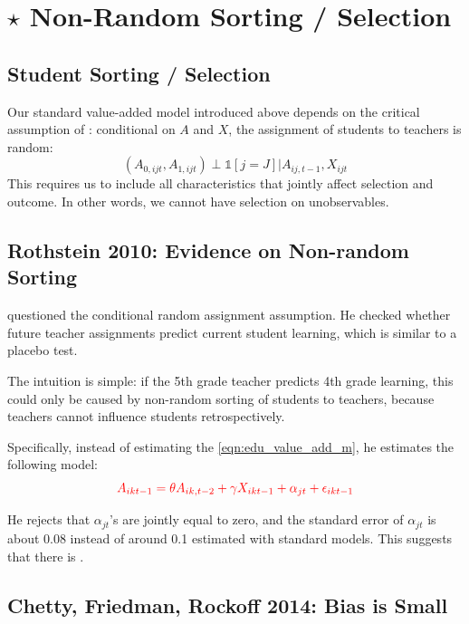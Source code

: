 \section{$\star$ Non-Random Sorting / Selection}
    
    \subsection{Student Sorting / Selection}
        Our standard value-added model introduced above depends on the critical assumption of : conditional on $A$ and $X$, the assignment of students to teachers is random:
        $$(A_{0,ijt},A_{1,ijt})\perp \mathds{1}[j=J]|A_{ij,t-1},X_{ijt}$$
        This requires us to include all characteristics that jointly affect selection and outcome. In other words, we cannot have selection on unobservables.
        
    \subsection{Rothstein 2010: Evidence on Non-random Sorting}
        \cite{rothstein_teacher_2010} questioned the conditional random assignment assumption. He checked whether future teacher assignments predict current student learning, which is similar to a placebo test.

        The intuition is simple: if the 5th grade teacher predicts 4th grade learning, this could only be caused by non-random sorting of students to teachers, because teachers cannot influence students retrospectively.

        Specifically, instead of estimating the \ref{eqn:edu_value_add_m}, he estimates the following model:
        \begin{equation*}
            \color{red}
                A_{ikt-1} = \theta A_{ik,t-2} + \gamma X_{ikt-1} + \alpha_{jt} + \epsilon_{ikt-1}
        \end{equation*}

        He rejects that $\alpha_{jt}$'s are jointly equal to zero, and the standard error of $\alpha_{jt}$ is about 0.08 instead of around 0.1 estimated with standard models. This suggests that there is .
        
    \subsection{Chetty, Friedman, Rockoff 2014: Bias is Small}

